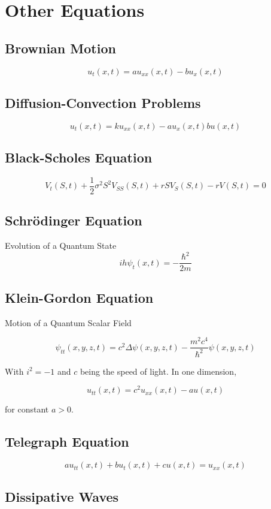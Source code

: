 \documentclass[12pt]{article}
\begin{document}
\section{Other Equations}

\subsection{Brownian Motion}

$$u_t(x, t) = au_{xx}(x,t) - bu_x(x, t)$$

\subsection{Diffusion-Convection Problems}

$$u_t(x, t) = ku_{xx}(x,t) - au_x(x, t)  bu(x,t)$$

\subsection{Black-Scholes Equation}

$$V_t(S, t) + \frac{1}{2}\sigma^2S^2V_{SS}(S,t) + rSV_S(S,t) - rV(S,t) = 0$$

\subsection{Schrödinger Equation}

Evolution of a Quantum State
$$ih\psi_t(x,t) = -\frac{\hbar^2}{2m} $$

\subsection{Klein-Gordon Equation}

Motion of a Quantum Scalar Field

$$\psi_{tt}(x,y,z,t) = c^2\Delta \psi(x,y,z,t)-\frac{m^2c^4}{\hbar^2}\psi(x,y,z,t) $$

With $i^2 = -1$ and $c$ being the speed of light. In one dimension,

$$u_{tt}(x,t) = c^2u_{xx}(x,t) - au(x,t)$$

for constant $a > 0$.

\subsection{Telegraph Equation}

$$au_{tt}(x,t) + bu_t(x,t) + cu(x,t) = u_{xx}(x,t) $$

\subsection{Dissipative Waves}
\end{document}
